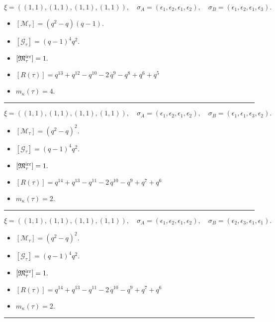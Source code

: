 \documentclass[10pt,a4paper]{amsart}
\begin{document}
$$\xi = ({(1, 1), (1, 1)}, {(1, 1), (1, 1)}),\quad \sigma_A = ({{\epsilon_1}, {\epsilon_2}}, {{\epsilon_1}, {\epsilon_2}}),\quad \sigma_B = ({{\epsilon_1}, {\epsilon_2}}, {{\epsilon_1}, {\epsilon_3}}).$$

\begin{itemize}
 \item $[\mathcal{M}_{\tau}] = {\left(q^{2} - q\right)} {\left(q - 1\right)} .$

 \item $[\mathcal{G}_{\tau}] = {\left(q - 1\right)}^{4} q^{2} .$

 \item $[{\frak M}_{\tau}^{\textrm{irr}}] = 1 .$

 \item $[R(\tau)] = q^{13} + q^{12} - q^{10} - 2 \, q^{9} - q^{8} + q^{6} + q^{5} $

 \item $m_{\kappa}(\tau) = 4 .$

 \end{itemize}
\noindent\rule{8cm}{0.4pt}

$$\xi = ({(1, 1), (1, 1)}, {(1, 1), (1, 1)}),\quad \sigma_A = ({{\epsilon_1}, {\epsilon_2}}, {{\epsilon_1}, {\epsilon_2}}),\quad \sigma_B = ({{\epsilon_1}, {\epsilon_1}}, {{\epsilon_3}, {\epsilon_2}}).$$

\begin{itemize}
 \item $[\mathcal{M}_{\tau}] = {\left(q^{2} - q\right)}^{2} .$

 \item $[\mathcal{G}_{\tau}] = {\left(q - 1\right)}^{4} q^{2} .$

 \item $[{\frak M}_{\tau}^{\textrm{irr}}] = 1 .$

 \item $[R(\tau)] = q^{14} + q^{13} - q^{11} - 2 \, q^{10} - q^{9} + q^{7} + q^{6} $

 \item $m_{\kappa}(\tau) = 2 .$

 \end{itemize}
\noindent\rule{8cm}{0.4pt}

$$\xi = ({(1, 1), (1, 1)}, {(1, 1), (1, 1)}),\quad \sigma_A = ({{\epsilon_1}, {\epsilon_2}}, {{\epsilon_1}, {\epsilon_2}}),\quad \sigma_B = ({{\epsilon_2}, {\epsilon_3}}, {{\epsilon_1}, {\epsilon_1}}).$$

\begin{itemize}
 \item $[\mathcal{M}_{\tau}] = {\left(q^{2} - q\right)}^{2} .$

 \item $[\mathcal{G}_{\tau}] = {\left(q - 1\right)}^{4} q^{2} .$

 \item $[{\frak M}_{\tau}^{\textrm{irr}}] = 1 .$

 \item $[R(\tau)] = q^{14} + q^{13} - q^{11} - 2 \, q^{10} - q^{9} + q^{7} + q^{6} $

 \item $m_{\kappa}(\tau) = 2 .$

 \end{itemize}
\noindent\rule{8cm}{0.4pt}
\end{document}
